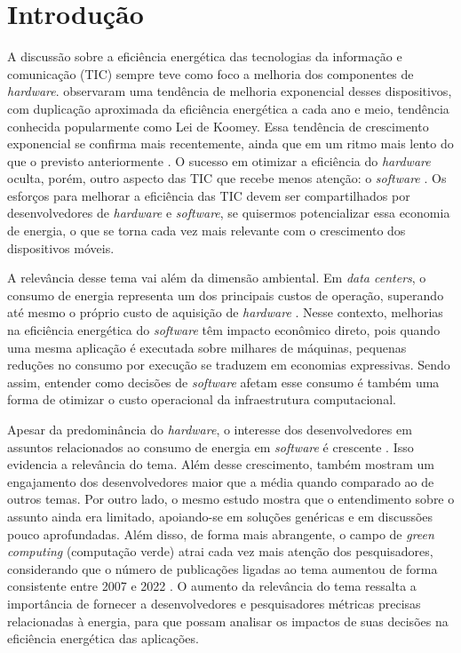 \chapter{Introdução}


A discussão sobre a eficiência energética das tecnologias da informação e
comunicação (TIC) sempre teve como foco a melhoria dos componentes de
\textit{hardware}.  observaram uma tendência de
melhoria exponencial desses dispositivos, com duplicação aproximada da
eficiência energética a cada ano e meio, tendência conhecida popularmente
como Lei de Koomey. Essa tendência de crescimento exponencial se confirma mais
recentemente, ainda que em um ritmo mais lento do que o previsto anteriormente
\cite{koomeys-law-revisited}. O sucesso em otimizar a eficiência do
\textit{hardware} oculta, porém, outro aspecto das TIC que recebe menos
atenção: o \textit{software} \cite{is-software-green}. Os esforços para
melhorar a eficiência das TIC devem ser compartilhados por desenvolvedores de
\textit{hardware} e \textit{software}, se quisermos potencializar essa economia
de energia, o que se torna cada vez mais relevante com o crescimento dos
dispositivos móveis.

A relevância desse tema vai além da dimensão ambiental. Em
\textit{data centers}, o consumo de energia representa um dos principais custos
de operação, superando até mesmo o próprio custo de aquisição
de \textit{hardware} \cite{datacenter-energy-survey}. Nesse contexto, 
melhorias na eficiência energética do \textit{software} têm 
impacto econômico direto, pois quando uma mesma aplicação é
executada sobre milhares de máquinas, pequenas reduções no consumo por execução
se traduzem em economias expressivas. Sendo assim, entender como decisões de
\textit{software} afetam esse consumo é também uma forma de otimizar o custo operacional 
da infraestrutura computacional.

Apesar da predominância do \textit{hardware}, o interesse dos desenvolvedores
em assuntos relacionados ao consumo de energia em \textit{software} é crescente
\cite{mining-questions}. Isso evidencia a relevância do tema. Além desse
crescimento,  também mostram um engajamento dos
desenvolvedores maior que a média quando comparado ao de outros temas. Por outro
lado, o mesmo estudo mostra que o entendimento sobre o assunto ainda era
limitado, apoiando-se em soluções genéricas e em discussões pouco aprofundadas.
Além disso, de forma mais abrangente, o campo de \textit{green computing}
(computação verde) atrai cada vez mais atenção dos pesquisadores, considerando
que o número de publicações ligadas ao tema aumentou de forma consistente entre
2007 e 2022 \cite{green-computing-past-present-future,
green-computing-literature-survey}. O aumento da relevância do tema ressalta a
importância de fornecer a desenvolvedores e pesquisadores métricas precisas
relacionadas à energia, para que possam analisar os impactos de suas decisões
na eficiência energética das aplicações.

